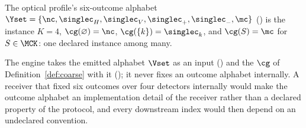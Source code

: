 
The optical profile's six-outcome alphabet
$\Yset=\{\nc,\singlec_H,\singlec_V,\singlec_+,\singlec_-,\mc\}$
() is the instance
$K=4$, $\cg(\varnothing)=\nc$, $\cg(\{k\})=\singlec_k$, and $\cg(S)=\mc$ for
$S\in\MCK$: one declared instance among many.

\begin{requirement}\label{req:declared-alphabet}
The engine takes the emitted alphabet $\Vset$ as an input
() and the 
$\cg$ of Definition~\ref{def:coarse} with it
(); it never fixes an outcome alphabet
internally. A receiver that fixed six outcomes over four detectors
internally would make the outcome alphabet an implementation detail of the
receiver rather than a declared property of the protocol, and every
downstream index would then depend on an undeclared convention.
\end{requirement}
